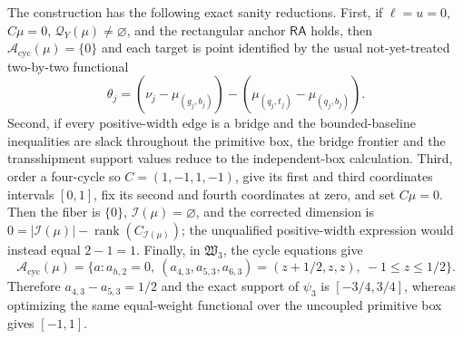 The construction has the following exact sanity reductions.  First, if \(\ell=u=0\), \(C\mu=0\), \(\mathcal Q_Y(\mu)\ne\varnothing\), and the rectangular anchor \(\mathsf{RA}\) holds, then \(\mathcal A_{\mathrm{cyc}}(\mu)=\{0\}\) and each target is point identified by the usual not-yet-treated two-by-two functional
\[
 \theta_j=(\nu_j-\mu_{(g_j,b_j)})-(\mu_{(q_j,t_j)}-\mu_{(q_j,b_j)}).
\]
Second, if every positive-width edge is a bridge and the bounded-baseline inequalities are slack throughout the primitive box, the bridge frontier and the transshipment support values reduce to the independent-box calculation.  Third, order a four-cycle so \(C=(1,-1,1,-1)\), give its first and third coordinates intervals \([0,1]\), fix its second and fourth coordinates at zero, and set \(C\mu=0\).  Then the fiber is \(\{0\}\), \(\mathcal I(\mu)=\varnothing\), and the corrected dimension is \(0=|\mathcal I(\mu)|-\operatorname{rank}(C_{\mathcal I(\mu)})\); the unqualified positive-width expression would instead equal \(2-1=1\).  Finally, in \(\mathfrak W_3\), the cycle equations give
\[
 \mathcal A_{\mathrm{cyc}}(\mu)=\{a:a_{h,2}=0,\ (a_{4,3},a_{5,3},a_{6,3})=(z+1/2,z,z),\ -1\le z\le1/2\}.
\]
Therefore \(a_{4,3}-a_{5,3}=1/2\) and the exact support of \(\psi_3\) is \([-3/4,3/4]\), whereas optimizing the same equal-weight functional over the uncoupled primitive box gives \([-1,1]\).
